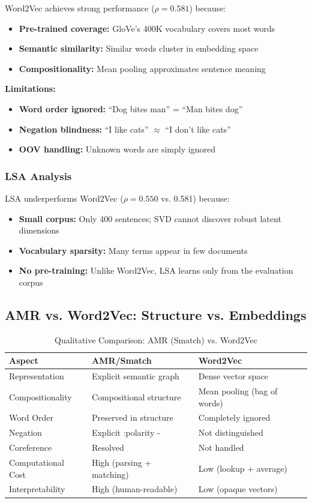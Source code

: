 \documentclass[11pt,a4paper]{article}
\begin{document}
Word2Vec achieves strong performance ($\rho = 0.581$) because:
\begin{itemize}
    \item \textbf{Pre-trained coverage:} GloVe's 400K vocabulary covers most words
    \item \textbf{Semantic similarity:} Similar words cluster in embedding space
    \item \textbf{Compositionality:} Mean pooling approximates sentence meaning
\end{itemize}

\textbf{Limitations:}
\begin{itemize}
    \item \textbf{Word order ignored:} ``Dog bites man'' = ``Man bites dog''
    \item \textbf{Negation blindness:} ``I like cats'' $\approx$ ``I don't like cats''
    \item \textbf{OOV handling:} Unknown words are simply ignored
\end{itemize}

\subsubsection{LSA Analysis}

LSA underperforms Word2Vec ($\rho = 0.550$ vs. 0.581) because:
\begin{itemize}
    \item \textbf{Small corpus:} Only 400 sentences; SVD cannot discover robust latent dimensions
    \item \textbf{Vocabulary sparsity:} Many terms appear in few documents
    \item \textbf{No pre-training:} Unlike Word2Vec, LSA learns only from the evaluation corpus
\end{itemize}

\subsection{AMR vs. Word2Vec: Structure vs. Embeddings}

\begin{table}[h]
\centering
\caption{Qualitative Comparison: AMR (Smatch) vs. Word2Vec}
\begin{tabular}{p{3cm}p{5cm}p{5cm}}
\toprule
\textbf{Aspect} & \textbf{AMR/Smatch} & \textbf{Word2Vec} \\
\midrule
Representation & Explicit semantic graph & Dense vector space \\
Compositionality & Compositional structure & Mean pooling (bag of words) \\
Word Order & Preserved in structure & Completely ignored \\
Negation & Explicit :polarity - & Not distinguished \\
Coreference & Resolved & Not handled \\
Computational Cost & High (parsing + matching) & Low (lookup + average) \\
Interpretability & High (human-readable) & Low (opaque vectors) \\
\bottomrule
\end{tabular}
\end{table}
\end{document}
